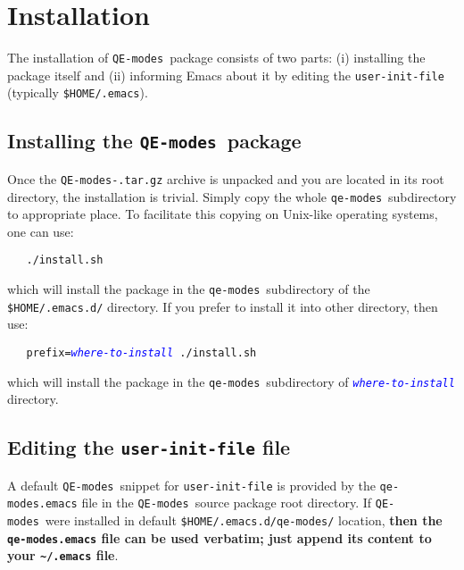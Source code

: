 \documentclass[12pt,a4paper]{article}
\def\QEmodes{\texttt{QE-modes}}
\def\qemodes{\texttt{qe-modes}}
\def\var#1{\textcolor{Blue}{\texttt{\textit{#1}}}}
\begin{document}
\section{Installation}

The installation of \QEmodes\ package consists of two parts: (i)
installing the package itself and (ii) informing Emacs about it by
editing the \verb+user-init-file+ (typically \verb+$HOME/.emacs+).

\subsection{Installing the \QEmodes\ package}
Once the \texttt{QE-modes-\version.tar.gz} archive is unpacked and you
are located in its root directory, the installation is trivial. Simply
copy the whole \qemodes\ subdirectory to appropriate place. To
facilitate this copying on Unix-like operating systems, one can use:
\begin{verbatim}
   ./install.sh
\end{verbatim}
which will install the package in the \qemodes\ subdirectory of the
\texttt{\$HOME/.emacs.d/} directory. If you prefer to install it into
other directory, then use:
\begin{flushleft}
\verb+   prefix=+\var{where-to-install}\verb+ ./install.sh+
\end{flushleft}
which will install the package in the \qemodes\ subdirectory of
\var{where-to-install} directory.


\subsection{Editing the \texttt{user-init-file} file}

A default \QEmodes\ snippet for \texttt{user-init-file} is provided by
the \texttt{qe-modes.emacs} file in the \QEmodes\ source package root
directory. If \QEmodes\ were installed in default
  \verb+$HOME/.emacs.d/qe-modes/+ location, {\bf then the
  \texttt{qe-modes.emacs} file can be used verbatim; just append its
  content to your \verb+~/.emacs+ file}.
\end{document}
